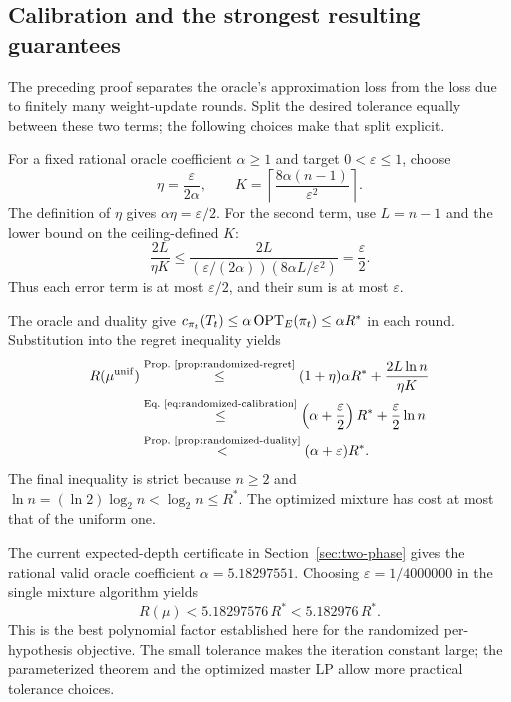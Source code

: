 \subsection{Calibration and the strongest resulting guarantees}

The preceding proof separates the oracle's approximation loss from
the loss due to finitely many weight-update rounds. Split the desired
tolerance equally between these two terms; the following choices
make that split explicit.

\begin{parameterchoice}
For a fixed rational oracle coefficient $\alpha\ge1$ and target
$0<\varepsilon\le1$, choose
\begin{equation}\label{eq:randomized-calibration}
 \eta=\frac{\varepsilon}{2\alpha},\qquad
 K=\left\lceil\frac{8\alpha(n-1)}{\varepsilon^2}\right\rceil.
\end{equation}
The definition of $\eta$ gives $\alpha\eta=\varepsilon/2$. For the
second term, use $L=n-1$ and the lower bound on the ceiling-defined $K$:
\[
 \frac{2L}{\eta K}
 \le \frac{2L}{(\varepsilon/(2\alpha))(8\alpha L/\varepsilon^2)}
 =\frac{\varepsilon}{2}.
\]
Thus each error term is at most $\varepsilon/2$, and their sum is at
most $\varepsilon$.
\end{parameterchoice}

The oracle and duality give
$c_{\pi_t}(T_t)\le\alpha\operatorname{OPT}_E(\pi_t)\le\alpha R^*$ in each round.
Substitution into the regret inequality yields
\[
\begin{aligned}
 R(\mu^{\rm unif})
 &\byref{Prop.}{prop:randomized-regret}{\le}
 (1+\eta)\alpha R^*+\frac{2L\ln n}{\eta K}\\
 &\byref{Eq.}{eq:randomized-calibration}{\le}
 \left(\alpha+\frac{\varepsilon}{2}\right)R^*
                      +\frac{\varepsilon}{2}\ln n\\
 &\byref{Prop.}{prop:randomized-duality}{<}(\alpha+\varepsilon)R^*.
\end{aligned}
\]
The final inequality is strict because $n\ge2$ and
$\ln n=(\ln2)\log_2n<\log_2n\le R^*$.
The optimized mixture has cost at most that of the uniform one.

The current expected-depth certificate in
Section~\ref{sec:two-phase} gives the rational valid oracle
coefficient $\alpha=5.18297551$. Choosing
$\varepsilon=1/4000000$ in the single mixture algorithm yields
\[
 R(\mu)<5.18297576\,R^*<5.182976\,R^*.
\]
This is the best polynomial factor established here for the
randomized per-hypothesis objective. The small tolerance makes the
iteration constant large; the parameterized theorem and the
optimized master LP allow more practical tolerance choices.


